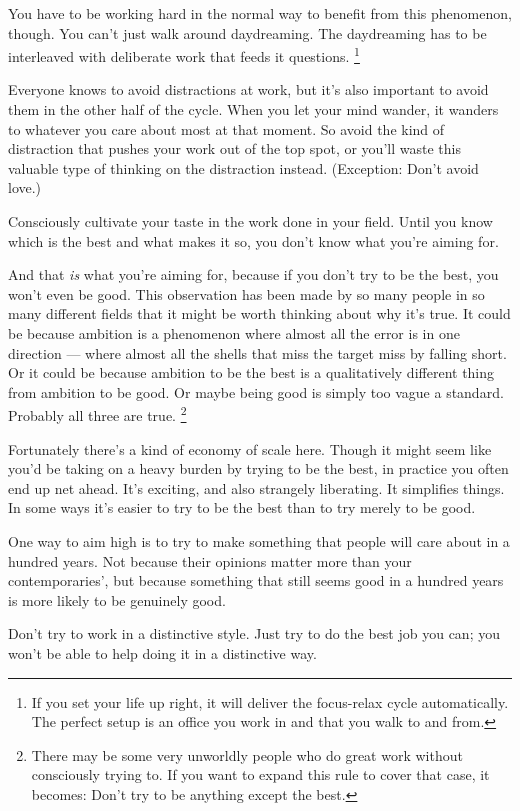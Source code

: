 \documentclass[12pt]{book}
\begin{document}
You have to be working hard in the normal way to benefit from this
phenomenon, though. You can't just walk around daydreaming. The
daydreaming has to be interleaved with deliberate work that feeds it
questions. \footnote{If you set your life up right, it will deliver the focus-relax
cycle automatically. The perfect setup is an office you work in and that
you walk to and from.}

Everyone knows to avoid distractions at work, but it's also important to
avoid them in the other half of the cycle. When you let your mind
wander, it wanders to whatever you care about most at that moment. So
avoid the kind of distraction that pushes your work out of the top spot,
or you'll waste this valuable type of thinking on the distraction
instead. (Exception: Don't avoid love.)

Consciously cultivate your taste in the work done in your field. Until
you know which is the best and what makes it so, you don't know what
you're aiming for.

And that \emph{is} what you're aiming for, because if you don't try to
be the best, you won't even be good. This observation has been made by
so many people in so many different fields that it might be worth
thinking about why it's true. It could be because ambition is a
phenomenon where almost all the error is in one direction --- where
almost all the shells that miss the target miss by falling short. Or it
could be because ambition to be the best is a qualitatively different
thing from ambition to be good. Or maybe being good is simply too vague
a standard. Probably all three are true. \footnote{There may be some very unworldly people who do great work
without consciously trying to. If you want to expand this rule to cover
that case, it becomes: Don't try to be anything except the best.}

Fortunately there's a kind of economy of scale here. Though it might
seem like you'd be taking on a heavy burden by trying to be the best, in
practice you often end up net ahead. It's exciting, and also strangely
liberating. It simplifies things. In some ways it's easier to try to be
the best than to try merely to be good.

One way to aim high is to try to make something that people will care
about in a hundred years. Not because their opinions matter more than
your contemporaries', but because something that still seems good in a
hundred years is more likely to be genuinely good.

Don't try to work in a distinctive style. Just try to do the best job
you can; you won't be able to help doing it in a distinctive way.
\end{document}
